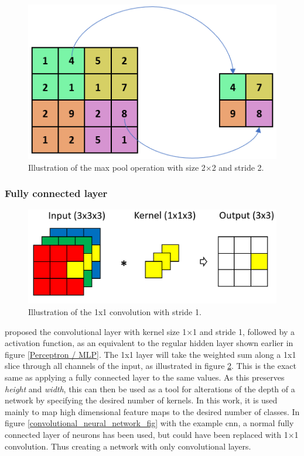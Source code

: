     \begin{figure}[H]
        \centering
        \includegraphics[scale=0.5]{figures/max_pool.png}
        \caption[The max pool operation]{Illustration of the max pool operation with size 2×2 and stride 2.}
      	\medskip 
        \label{maxpool_fig}
    \end{figure}

\subsubsection{Fully connected layer}
    \begin{figure}[H]
        \centering
        \includegraphics[scale=0.35]{figures/1x1.png}
        \caption[1x1 convolution]{Illustration of the 1x1 convolution with stride 1.}
      	\medskip 
        \label{1x1_fig}
    \end{figure}
    \citeauthor{lin2013network_in_network_1x1}\cite{lin2013network_in_network_1x1} proposed the convolutional layer with kernel size 1×1 and stride 1, followed by a activation function, as an equivalent to the regular hidden layer shown earlier in figure \ref{Perceptron / MLP}\cite{lin2013network_in_network_1x1}. The 1x1 layer will take the weighted sum along a 1x1 slice through all channels of the input, as illustrated in figure \ref{1x1_fig}. This is the exact same as applying a fully connected layer to the same values. As this preserves \textit{height} and \textit{width}, this can then be used as a tool for alterations of the depth of a network by specifying the desired number of kernels. In this work, it is used mainly to map high dimensional feature maps to the desired number of classes. In figure \ref{convolutional_neural_network_fig} with the example \gls{cnn}, a normal fully connected layer of neurons has been used, but could have been replaced with 1×1 convolution. Thus creating a network with only convolutional layers. 
    
